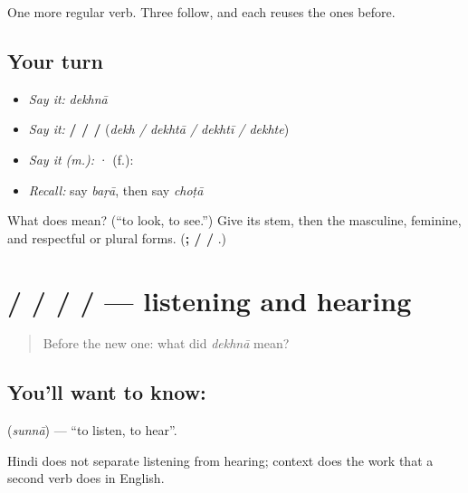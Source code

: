 \begin{grammarlens}[title={What you've built}]
One more regular verb. Three follow, and each reuses the ones before.
\end{grammarlens}

\subsection*{Your turn}
\begin{itemize}
\raggedright
  \item \emph{Say it:} \emph{dekhnā}
  \item \emph{Say it:} \textbf{ /  /  / } (\emph{dekh / dekhtā / dekhtī / dekhte})
  \item \emph{Say it (m.):} \textbf{  } · (f.): \textbf{  }
  \item \emph{Recall:} say \emph{baṛā}, then say \emph{choṭā}
\end{itemize}

\begin{tcolorbox}[breakable,colback=teal!4,colframe=teal!35!black,title={Before you move on}]
What does  mean? (\textquotedblleft{}to look, to see.\textquotedblright{}) Give its stem, then the masculine, feminine, and respectful or plural forms. (\textbf{;  /  / }.)
\end{tcolorbox}
\section[\texorpdfstring{\hi{सुनना} / \hi{सुन} / \hi{सुनता} … (sunnā / sun …)}{सुनना / सुन / सुनता … (sunnā / sun …)}]{ /  /  /  /  — listening and hearing}

\label{lesson:HI-C43-listen}



\begin{quote}
Before the new one: what did \emph{dekhnā} mean?
\end{quote}

\subsection*{You'll want to know: }
\textbf{} (\emph{sunnā}) — \textquotedblleft{}to listen, to hear\textquotedblright{}.

Hindi does not separate listening from hearing; context does the work that a second verb does in English.

